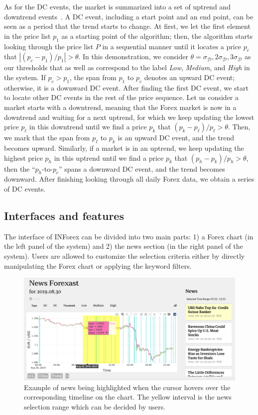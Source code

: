 \documentclass[sigconf]{acmart}
\begin{document}
As for the DC events, the market is summarized into a set of uptrend and downtrend events~\cite{7850020}.
A DC event, including a start point and an end point, can be seen as a period that the trend starts to change.
At first, we let the first element in the price list $p_1$ as a starting point of the algorithm; then, the algorithm starts looking through the price list $P$ in a sequential manner until it locates a price $p_c$ that $|{(p_c-p_1)}/{p_1}|>\theta$.
In this demonstration, we consider $\theta=\sigma_{\mathcal{D}},2\sigma_{\mathcal{D}},3\sigma_{\mathcal{D}}$ as our thresholds that as well as correspond to the label \emph{Low}, \emph{Medium}, and \emph{High} in the system.
If $p_c > p_1$, the span from $p_1$ to $p_c$ denotes an upward DC event; otherwise, it is a downward DC event.
After finding the first DC event, we start to locate other DC events in the rest of the price sequence.
Let us consider a market starts with a downtrend, meaning that the Forex market is now in a downtrend and waiting for a next uptrend, for which we keep updating the lowest price $p_\ell$ in this downtrend until we find a price $p_k$ that ${(p_k-p_\ell)}/{p_\ell}>\theta$. Then, we mark that the span from $p_\ell$ to $p_k$ is an upward DC event, and the trend becomes upward.
Similarly, if a market is in an uptrend, we keep updating the highest price $p_h$ in this uptrend until we find a price $p_k$ that ${(p_h-p_k)}/{p_h}>\theta$, then the ``$p_h$-to-$p_c$'' spans a downward DC event, and the trend becomes downward.
After finishing looking through all daily Forex data, we obtain a series of DC events.




\subsection{Interfaces and features}
The interface of INForex can be divided into two main parts: 1) a Forex chart (in the left panel of the system) and 2) the news section (in the right panel of the system).
Users are allowed to customize the selection criteria either by directly manipulating the Forex chart or applying the keyword filters.

\begin{figure}[h]
  \centering
  \includegraphics[width=\linewidth]{hover.png}
  \caption{Example of news being highlighted when the cursor hovers over the corresponding timeline on the chart. The yellow interval is the news selection range which can be decided by users.}
  \label{fig:hover}
\end{figure}
\end{document}
